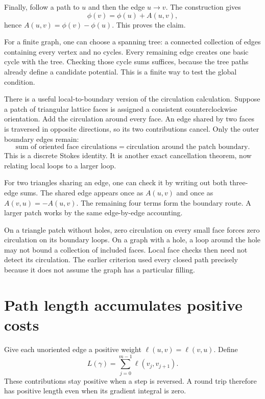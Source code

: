 \documentclass[11pt,oneside,openany]{book}
\theoremstyle{definition}
\theoremstyle{remark}
\numberwithin{equation}{chapter}
\begin{document}
Finally, follow a path to \(u\) and then the edge \(u\to v\). The construction gives \[\phi(v)=\phi(u)+A(u,v),\] hence \(A(u,v)=\phi(v)-\phi(u)\). This proves the claim.

For a finite graph, one can choose a spanning tree: a connected collection of edges containing every vertex and no cycles. Every remaining edge creates one basic cycle with the tree. Checking those cycle sums suffices, because the tree paths already define a candidate potential. This is a finite way to test the global condition.

There is a useful local-to-boundary version of the circulation calculation. Suppose a patch of triangular lattice faces is assigned a consistent counterclockwise orientation. Add the circulation around every face. An edge shared by two faces is traversed in opposite directions, so its two contributions cancel. Only the outer boundary edges remain: \[\boxed{\text{sum of oriented face circulations}
=\text{circulation around the patch boundary}.}\] This is a discrete Stokes identity. It is another exact cancellation theorem, now relating local loops to a larger loop.

For two triangles sharing an edge, one can check it by writing out both three-edge sums. The shared edge appears once as \(A(u,v)\) and once as \(A(v,u)=-A(u,v)\). The remaining four terms form the boundary route. A larger patch works by the same edge-by-edge accounting.

On a triangle patch without holes, zero circulation on every small face forces zero circulation on its boundary loops. On a graph with a hole, a loop around the hole may not bound a collection of included faces. Local face checks then need not detect its circulation. The earlier criterion used every closed path precisely because it does not assume the graph has a particular filling.

\section{Path length accumulates positive costs}\label{ch08-path-length-accumulates-positive-costs}

Give each unoriented edge a positive weight \(\ell(u,v)=\ell(v,u)\). Define \[L(\gamma)=\sum_{j=0}^{m-1}\ell(v_j,v_{j+1}).\] These contributions stay positive when a step is reversed. A round trip therefore has positive length even when its gradient integral is zero.
\end{document}
